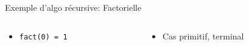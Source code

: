 \documentclass[table,handout,tikz,12pt,svgnames]{beamer}
\begin{document}
\begin{frame}[fragile=singleslide]
\begin{block}{}
\begin{itemize}
\begin{block}{Exemple d'algo récursive: Factorielle}
\begin{columns}[c]
\begin{column}{0.55\textwidth}
\begin{itemize}
							\item \texttt{fact(0) = 1}
						\end{itemize}
					\end{column}
					\hspace{-0.33cm}
					\vrule{}
					\hspace{0cm}	
					\begin{column}{0.45\textwidth}
						\begin{itemize}
							\item Cas primitif, terminal
						\end{itemize}
				    \end{column}
				\end{columns}
				\end{block}					
			\end{itemize}
		\end{block}
\end{frame}
\end{document}

